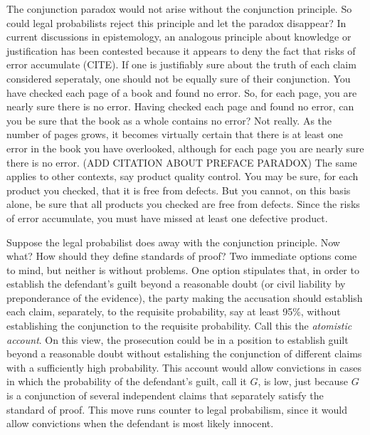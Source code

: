 \documentclass[10pt,dvipsnames,enabledeprecatedfontcommands]{scrartcl}
\begin{document}
The conjunction paradox would not arise without the conjunction
principle. So could legal probabilists reject this principle and let the
paradox disappear? In current discussions in epistemology, an analogous
principle about knowledge or justification has been contested because it
appears to deny the fact that risks of error accumulate (CITE).
If one is justifiably sure about the truth of each claim considered
seperataly, one should not be equally sure of their conjunction. You
have checked each page of a book and found no error. So, for each page,
you are nearly sure there is no error. Having checked each page and
found no error, can you be sure that the book as a whole contains no
error? Not really. As the number of pages grows, it becomes virtually
certain that there is at least one error in the book you have
overlooked, although for each page you are nearly sure there is no
error. (ADD CITATION ABOUT PREFACE PARADOX) The same applies to other
contexts, say product quality control. You may be sure, for each product
you checked, that it is free from defects. But you cannot, on this basis
alone, be sure that all products you checked are free from defects.
Since the risks of error accumulate, you must have missed at least one
defective product.

Suppose the legal probabilist does away with the conjunction principle.
Now what? How should they define standards of proof? Two immediate
options come to mind, but neither is without problems. One option
stipulates that, in order to establish the defendant's guilt beyond a
reasonable doubt (or civil liability by preponderance of the evidence),
the party making the accusation should establish each claim, separately,
to the requisite probability, say at least 95\%, without establishing
the conjunction to the requisite probability. Call this the
\textit{atomistic account}. On this view, the prosecution could be in a
position to establish guilt beyond a reasonable doubt without
estalishing the conjunction of different claims with a sufficiently high
probability. This account would allow convictions in cases in which the
probability of the defendant's guilt, call it \(G\), is low, just
because \(G\) is a conjunction of several independent claims that
separately satisfy the standard of proof. This move runs counter to
legal probabilism, since it would allow convictions when the defendant
is most likely innocent.
\end{document}
